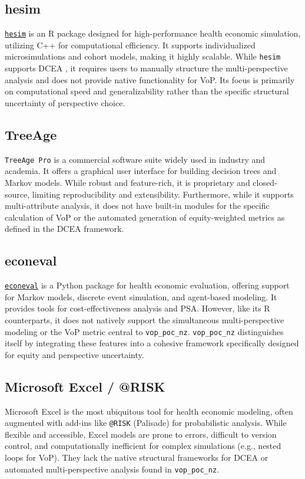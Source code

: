 \documentclass{article}
\newcommand{\pkg}[1]{\texttt{#1}}
\newcommand{\proglang}[1]{\textsf{#1}}
\begin{document}
\subsection[hesim]{hesim}
\href{https://github.com/hesim-dev/hesim}{\pkg{hesim}} \citep{incerti2021} is an \proglang{R} package designed for high-performance health economic simulation, utilizing \proglang{C++} for computational efficiency.
It supports individualized microsimulations and cohort models, making it highly scalable.
While \pkg{hesim} supports DCEA \citep{incerti2021dcea}, it requires users to manually structure the multi-perspective analysis and does not provide native functionality for VoP.
Its focus is primarily on computational speed and generalizability rather than the specific structural uncertainty of perspective choice.

\subsection[TreeAge]{TreeAge}
\pkg{TreeAge Pro} is a commercial software suite widely used in industry and academia.
It offers a graphical user interface for building decision trees and Markov models.
While robust and feature-rich, it is proprietary and closed-source, limiting reproducibility and extensibility.
Furthermore, while it supports multi-attribute analysis, it does not have built-in modules for the specific calculation of VoP or the automated generation of equity-weighted metrics as defined in the DCEA framework.

\subsection[econeval]{econeval}
\href{https://github.com/hmelberg/econeval}{\pkg{econeval}} is a \proglang{Python} package for health economic evaluation, offering support for Markov models, discrete event simulation, and agent-based modeling.
It provides tools for cost-effectiveness analysis and PSA.
However, like its R counterparts, it does not natively support the simultaneous multi-perspective modeling or the VoP metric central to \pkg{vop\_poc\_nz}.
\pkg{vop\_poc\_nz} distinguishes itself by integrating these features into a cohesive framework specifically designed for equity and perspective uncertainty.

\subsection[Excel]{Microsoft Excel / @RISK}
Microsoft Excel is the most ubiquitous tool for health economic modeling, often augmented with add-ins like \pkg{@RISK} (Palisade) for probabilistic analysis.
While flexible and accessible, Excel models are prone to errors, difficult to version control, and computationally inefficient for complex simulations (e.g., nested loops for VoP).
They lack the native structural frameworks for DCEA or automated multi-perspective analysis found in \pkg{vop\_poc\_nz}.
\end{document}
